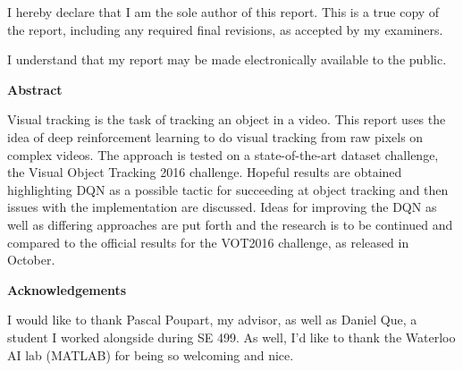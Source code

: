   \noindent
I hereby declare that I am the sole author of this report. This is a true copy of the report, including any required final revisions, as accepted by my examiners.

  \bigskip
  
  \noindent
I understand that my report may be made electronically available to the public.

\cleardoublepage


\begin{center}\textbf{Abstract}\end{center}

Visual tracking is the task of tracking an object in a video. This report uses the idea of deep reinforcement learning to do visual tracking from raw pixels on complex videos. The approach is tested on a state-of-the-art dataset challenge, the Visual Object Tracking 2016 challenge. Hopeful results are obtained highlighting DQN as a possible tactic for succeeding at object tracking and then issues with the implementation are discussed. Ideas for improving the DQN as well as differing approaches are put forth and the research is to be continued and compared to the official results for the VOT2016 challenge, as released in October.


\cleardoublepage


\begin{center}\textbf{Acknowledgements}\end{center}

I would like to thank Pascal Poupart, my advisor, as well as Daniel Que, a student I worked alongside during SE 499. As well, I'd like to thank the Waterloo AI lab (MATLAB) for being so welcoming and nice.
\cleardoublepage


\renewcommand\contentsname{Table of Contents}
\tableofcontents
\cleardoublepage
{}


